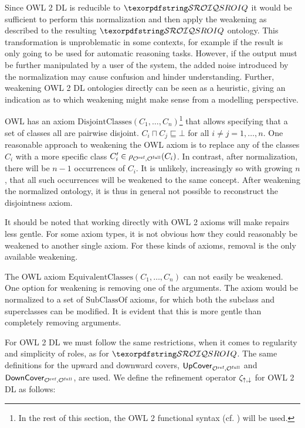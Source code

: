 Since OWL 2 DL is reducible to $\SROIQ$ it would be sufficient to perform this normalization and then apply the weakening as described to the resulting $\SROIQ$ ontology. This transformation is unproblematic in some contexts, for example if the result is only going to be used for automatic reasoning tasks. However, if the output must be further manipulated by a user of the system, the added noise introduced by the normalization may cause confusion and hinder understanding. Further, weakening OWL 2 DL ontologies directly can be seen as a heuristic, giving an indication as to which weakening might make sense from a modelling perspective.

\begin{example}
OWL has an axiom $\mathrm{DisjointClasses}(C_1, \dots, C_n)$\footnote{In the rest of this section, the OWL 2 functional syntax (cf. \cite{motik2012ontology}) will be used.} that allows specifying that a set of classes all are pairwise disjoint. $C_i \sqcap C_j \sqsubseteq \bot$ for all $i \not= j = 1, \dots, n$. One reasonable approach to weakening the OWL axiom is to replace any of the classes $C_i$ with a more specific class $C_i' \in \rho_{{\mathcal{O}^\textnormal{ref}},{\mathcal{O}^\textnormal{full}}}(C_i)$. In contrast, after normalization, there will be $n - 1$ occurrences of $C_i$. It is unlikely, increasingly so with growing $n$, that all such occurrences will be weakened to the same concept. After weakening the normalized ontology, it is thus in general not possible to reconstruct the disjointness axiom.
\end{example}

It should be noted that working directly with OWL 2 axioms will make repairs less gentle. For some axiom types, it is not obvious how they could reasonably be weakened to another single axiom. For these kinds of axioms, removal is the only available weakening.

\begin{example}
The OWL axiom $\mathrm{EquivalentClasses}(C_1, \dots, C_n)$ can not easily be weakened. One option for weakening is removing one of the arguments. The axiom would be normalized to a set of $\mathrm{SubClassOf}$ axioms, for which both the subclass and superclasses can be modified. It is evident that this is more gentle than completely removing arguments.
\end{example}

For OWL 2 DL we must follow the same restrictions, when it comes to regularity and simplicity of roles, as for $\SROIQ$. The same definitions for the upward and downward covers, ${\mathsf{UpCover}}_{{\mathcal{O}^\textnormal{ref}},{\mathcal{O}^\textnormal{full}}}$ and ${\mathsf{DownCover}}_{{\mathcal{O}^\textnormal{ref}},{\mathcal{O}^\textnormal{full}}}$, are used. We define the refinement operator $\zeta_{\mathop{\uparrow},\mathop{\downarrow}}$ for OWL 2 DL as follows:

